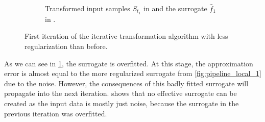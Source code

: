 \documentclass[
  a4paper,  %
  twoside,  %
  bibliography=totoc,
  headsepline,
  cleardoublepage=empty,
  parskip=half,
  draft=false
]{scrbook}
\begin{document}
\begin{mdframed}[style=style]
\begin{figure}[H]
\begin{subfigure}{.5\textwidth}
  \caption{Transformed input samples $S_{t_1}$ in \blue and the surrogate $\hat{f}_1$ in \red.}
\label{fig:pipeline_bad_local_1}
\end{subfigure}
\delimit
\caption{First iteration of the iterative transformation algorithm with less regularization than before.}
\label{fig:pipeline_bad_1}
\end{figure}
\end{mdframed}
%
As we can see in \cref{fig:pipeline_bad_local_1}, the surrogate is overfitted.
At this stage, the approximation error is almost equal to the more regularized surrogate from \cref{fig:pipeline_local_1} due to the noise.
However, the consequences of this badly fitted surrogate will propagate into the next iteration.
 shows that no effective surrogate can be created as the input data is mostly just noise, because the surrogate in the previous iteration was overfitted.
\end{document}
